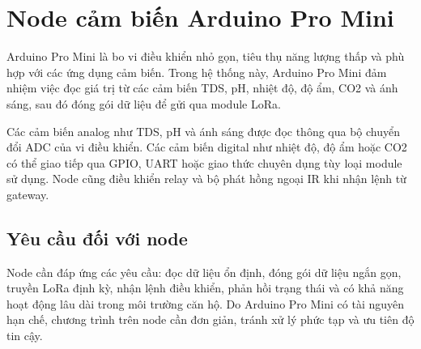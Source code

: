 \section{Node cảm biến Arduino Pro Mini}
Arduino Pro Mini là bo vi điều khiển nhỏ gọn, tiêu thụ năng lượng thấp và phù hợp với các ứng dụng cảm biến. Trong hệ thống này, Arduino Pro Mini đảm nhiệm việc đọc giá trị từ các cảm biến TDS, pH, nhiệt độ, độ ẩm, CO2 và ánh sáng, sau đó đóng gói dữ liệu để gửi qua module LoRa.

Các cảm biến analog như TDS, pH và ánh sáng được đọc thông qua bộ chuyển đổi ADC của vi điều khiển. Các cảm biến digital như nhiệt độ, độ ẩm hoặc CO2 có thể giao tiếp qua GPIO, UART hoặc giao thức chuyên dụng tùy loại module sử dụng. Node cũng điều khiển relay và bộ phát hồng ngoại IR khi nhận lệnh từ gateway.

\subsection{Yêu cầu đối với node}
Node cần đáp ứng các yêu cầu: đọc dữ liệu ổn định, đóng gói dữ liệu ngắn gọn, truyền LoRa định kỳ, nhận lệnh điều khiển, phản hồi trạng thái và có khả năng hoạt động lâu dài trong môi trường căn hộ. Do Arduino Pro Mini có tài nguyên hạn chế, chương trình trên node cần đơn giản, tránh xử lý phức tạp và ưu tiên độ tin cậy.

